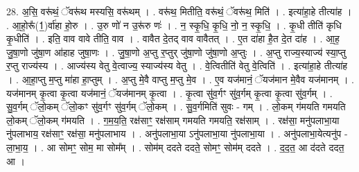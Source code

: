 \documentclass[17pt]{extarticle}
\begin{document}
28. अ॒सि॒ वरू॑थं॒ ॅवरू॑थ मस्यसि॒ वरू॑थम् । . वरू॑थ॒ मितीति॒ वरू॑थं॒ ॅवरू॑थ॒ मिति॑ । . इत्या॑हा॒हे तीत्या॑ह । . आ॒हो॒रू᳚(1॒)र्वा॑हा हो॒रु । . उ॒रु णो॑ न उ॒रू॑रु णः॑ । . न॒ स्कृ॒धि॒ कृ॒धि॒ नो॒ न॒ स्कृ॒धि॒ । . कृ॒धी तीति॑ कृधि कृ॒धीति॑ । . इति॒ वाव वावे तीति॒ वाव । . वावैत दे॒तद् वाव वावैतत् । . ए॒त दा॑हा है॒त दे॒त दा॑ह । . आ॒ह॒ जु॒षा॒णो जु॑षा॒ण आ॑हाह जुषा॒णः । . जु॒षा॒णो अ॒प्तु र॒प्तुर् जु॑षा॒णो जु॑षा॒णो अ॒प्तुः । . अ॒प्तु राज्य॒स्याज्य॑ स्या॒प्तु र॒प्तु राज्य॑स्य । . आज्य॑स्य वेतु वे॒त्वाज्य॒ स्याज्य॑स्य वेतु । . वे॒त्वितीति॑ वेतु वे॒त्विति॑ । . इत्या॑हा॒हे तीत्या॑ह । . आ॒हा॒प्तु म॒प्तु मा॑हा हा॒प्तुम् । . अ॒प्तु मे॒वै वाप्तु म॒प्तु मे॒व । . ए॒व यज॑मानं॒ ॅयज॑मान मे॒वैव यज॑मानम् । . यज॑मानम् कृ॒त्वा कृ॒त्वा यज॑मानं॒ ॅयज॑मानम् कृ॒त्वा । . कृ॒त्वा सु॑व॒र्गꣳ सु॑व॒र्गम् कृ॒त्वा कृ॒त्वा सु॑व॒र्गम् । . सु॒व॒र्गम् ॅलो॒कम् ॅलो॒कꣳ सु॑व॒र्गꣳ सु॑व॒र्गम् ॅलो॒कम् । . सु॒व॒र्गमिति॑ सुवः - गम् । . लो॒कम् ग॑मयति गमयति लो॒कम् ॅलो॒कम् ग॑मयति । . ग॒म॒य॒ति॒ रक्ष॑साꣳ॒॒ रक्ष॑साम् गमयति गमयति॒ रक्ष॑साम् । . रक्ष॑सा॒ मनु॑पलाभा॒या नु॑पलाभाय॒ रक्ष॑साꣳ॒॒ रक्ष॑सा॒ मनु॑पलाभाय । . अनु॑पलाभा॒या ऽनु॑पलाभा॒या नु॑पलाभा॒या । . अनु॑पलाभा॒येत्यनु॑प - ला॒भा॒य॒ । . आ सोमꣳ॒॒ सोम॒ मा सोम᳚म् । . सोम॑म् ददते ददते॒ सोमꣳ॒॒ सोम॑म् ददते । . द॒द॒त॒ आ द॑दते ददत॒ आ । \newline
\end{document}

